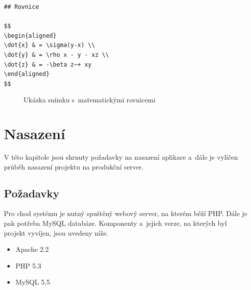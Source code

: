 \documentclass[11pt,twoside,a4paper]{book}
\begin{document}
\newpage

\begin{lstlisting}[caption={Ukázka syntaxe matematických vzorců},label={lst:rovnice},captionpos=b]
## Rovnice

$$
\begin{aligned}
\dot{x} & = \sigma(y-x) \\
\dot{y} & = \rho x - y - xz \\
\dot{z} & = -\beta z~+ xy
\end{aligned}
$$
\end{lstlisting}

\begin{figure}[ht]
	\begin{center}
		\caption{Ukázka snímku s~matematickými rovnicemi}
		\label{fig:rovnice}
	\end{center}
\end{figure}



\chapter{Nasazení}
V této kapitole jsou shrnuty požadavky na nasazení aplikace a~dále je vylíčen průběh nasazení projektu na produkční server.

\section{Požadavky}
Pro chod systému je nutný spuštěný webový server, na kterém běží PHP. Dále je pak potřeba MySQL databáze. Komponenty a~jejich verze, na kterých byl projekt vyvíjen, jsou uvedeny níže.

\begin{itemize}
	\item Apache 2.2
	\item PHP 5.3
	\item MySQL 5.5
\end{itemize}
\end{document}
